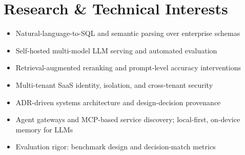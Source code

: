 \documentclass[11pt,letterpaper]{article}
\begin{document}
\section{Research \& Technical Interests}
\begin{itemize}
  \item Natural-language-to-SQL and semantic parsing over enterprise schemas
  \item Self-hosted multi-model LLM serving and automated evaluation
  \item Retrieval-augmented reranking and prompt-level accuracy interventions
  \item Multi-tenant SaaS identity, isolation, and cross-tenant security
  \item ADR-driven systems architecture and design-decision provenance
  \item Agent gateways and MCP-based service discovery; local-first, on-device memory for LLMs
  \item Evaluation rigor: benchmark design and decision-match metrics
\end{itemize}

\end{document}
